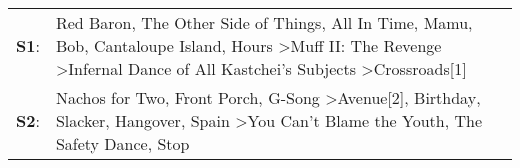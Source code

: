 \begin{supertabular}{p{0.03\textwidth}p{0.92\textwidth}}
 \textbf{S1}:  &  Red Baron\textsuperscript{}, \enspace The Other Side of Things\textsuperscript{}, \enspace All In Time\textsuperscript{}, \enspace Mamu\textsuperscript{}, \enspace Bob\textsuperscript{}, \enspace Cantaloupe Island\textsuperscript{}, \enspace Hours\textsuperscript{} \textgreater \enspace Muff II: The Revenge\textsuperscript{} \textgreater \enspace Infernal Dance of All Kastchei's Subjects\textsuperscript{} \textgreater \enspace Crossroads[1]\textsuperscript{}  \enspace  \\
 \textbf{S2}:  &                   Nachos for Two\textsuperscript{}, \enspace Front Porch\textsuperscript{}, \enspace G-Song\textsuperscript{} \textgreater \enspace Avenue[2]\textsuperscript{}, \enspace Birthday\textsuperscript{}, \enspace Slacker\textsuperscript{}, \enspace Hangover\textsuperscript{}, \enspace Spain\textsuperscript{} \textgreater \enspace You Can't Blame the Youth\textsuperscript{}, \enspace The Safety Dance\textsuperscript{}, \enspace Stop\textsuperscript{}  \enspace  \\
\end{supertabular}
